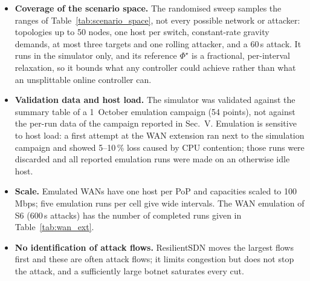 \begin{itemize}
  evaluated in simulation only. Against the routing-aware rolling attacker, rerouting can be worse
  than not reacting: in the sweep this happened in 31\,\% of the rolling instances for ResilientSDN
  and 11\,\% for TE-$\Phi$ (Sec.~\ref{sec:sweep}). A defence would need to stop moving traffic once
  the target follows it (e.g.\ by detecting re-targeting), which we have not implemented.
\item \textbf{Coverage of the scenario space.} The randomised sweep samples the ranges of
  Table~\ref{tab:scenario_space}, not every possible network or attacker: topologies up to 50
  nodes, one host per switch, constant-rate gravity demands, at most three targets and one rolling
  attacker, and a 60\,s attack. It runs in the simulator only, and its reference $\Phi^\star$ is a
  fractional, per-interval relaxation, so it bounds what any controller could achieve rather than
  what an unsplittable online controller can.
\item \textbf{Validation data and host load.} The simulator was validated against the summary
  table of a 1~October emulation campaign (54 points), not against the per-run data of the campaign
  reported in Sec.~V. Emulation is sensitive to host load: a first attempt at the WAN extension ran
  next to the simulation campaign and showed 5--10\,\% loss caused by CPU contention; those runs were
  discarded and all reported emulation runs were made on an otherwise idle host.
\item \textbf{Scale.} Emulated WANs have one host per PoP and capacities scaled to 100\,Mbps; five
  emulation runs per cell give wide intervals. The WAN emulation of S6 (600\,s attacks) has the
  number of completed runs given in Table~\ref{tab:wan_ext}.
\item \textbf{No identification of attack flows.} ResilientSDN moves the largest flows first and
  these are often attack flows; it limits congestion but does not stop the attack, and a
  sufficiently large botnet saturates every cut.
\end{itemize}
